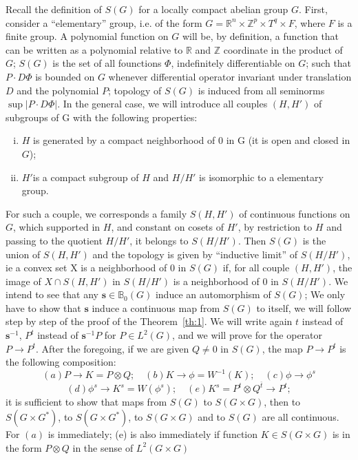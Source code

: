 \documentclass[12pt]{amsart}
\def\bR{{\mathbb{R}}}
\def\bZ{{\mathbb{Z}}}
\def\bB{{\mathbb{B}}}
\def\bs{{\mathbf{s}}}
\def\abs#1{\left|{#1}\right|}
\begin{document}
Recall the definition of $S(G)$ for a locally compact abelian group $G$.
First, consider a ``elementary'' group, i.e. of the form 
$G=\bR^n\times \bZ^p\times T^q\times F$, where $F$ is a finite group. 
A polynomial function on $G$ will be, by definition, 
a function that can be written as  a polynomial relative to 
$\bR$ and $\bZ$ coordinate in the product of $G$;
$S(G)$ is the set of all founctions $\Phi$, indefinitely differentiable 
on $G$; such that $P\cdot D\Phi$ is bounded on $G$ 
whenever differential operator invariant under 
translation $D$ and the polynomial $P$; 	
topology of $S(G)$ is induced from all seminorms $\sup\abs{P\cdot D\Phi}$.
In the general case, we will introduce
all couples $(H, H')$ of subgroups of G with the following properties:
\begin{enumerate}[(i)]
\item $H$ is generated by a compact neighborhood of $0$ 
in G (it is open and closed in $G$);
\item $H'$is a compact subgroup of $H$ and $H/H'$ is isomorphic to
 a elementary group.  
\end{enumerate}
For such a couple, we corresponds a family  $S(H, H')$
of continuous functions on $G$, which supported in $H$, and constant on cosets 
of $H'$, 	
by restriction to $H$ and passing to the quotient $H/H'$, 
it  belongs to $S(H/H')$. 	
Then $S(G)$ is the union of $S(H,H')$ 
and  the topology is given by ``inductive limit'' of $S(H/H')$, 
ie a convex set X is a neighborhood of $0$ in $S(G)$ if, 
for all couple $(H,H')$, the image of $X\cap S(H,H')$ in $S(H/H')$ 
is a neighborhood of $0$ in $S(H/H')$.
We intend to see that any $\bs\in \bB_0(G)$ induce an automorphism of $S(G)$;
We only have to show that $\bs$ induce a continuous map 
from $S(G)$ to itself, we will follow step by step of the proof of 
the Theorem~\ref{th:1}.  	
We will write again $t$ instead of $\bs^{-1}$, $P^t$ 	
instead of $\bs^{-1}P$ for $P\in L^2(G)$, 	
and we will prove for the operator $P\to  P^t$.
After the foregoing, if we are given $Q\neq 0$ in $S(G)$,
the map $P\to P^t$ is the following composition:
\[
(a) P\to K=P\otimes Q;\quad (b)K\to \phi=W^{-1}(K);\quad (c) \phi\to \phi^s
\]
\[
(d) \phi^s\to K^s=W(\phi^s);\quad (e) K^s= P^t\otimes Q^{\overline{t}}\to P^t;
\]
it is sufficient to show that maps  from $S(G)$ to  $S(G\times G)$, 
then to $S(G\times G^*)$,
to $S(G\times G^*)$, to $S(G\times G)$ and to $S(G)$ are all continuous.
For $(a)$ is immediately; (e) is also immediately if function 
$K\in S(G\times G)$ is in the form $P\otimes Q$ in the sense of $L^2(G\times G)$
\end{document}
